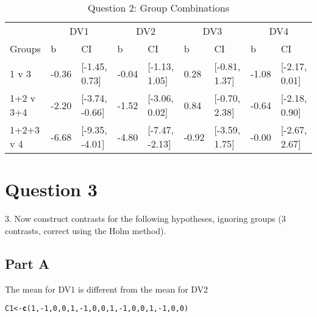 \documentclass{article}\usepackage[]{graphicx}\usepackage[]{color}
\makeatletter
\newcommand{\hlnum}[1]{\textcolor[rgb]{0.686,0.059,0.569}{#1}}%
\newcommand{\hlopt}[1]{\textcolor[rgb]{0,0,0}{#1}}%
\newcommand{\hlstd}[1]{\textcolor[rgb]{0.345,0.345,0.345}{#1}}%
\newcommand{\hlkwb}[1]{\textcolor[rgb]{0.69,0.353,0.396}{#1}}%
\newcommand{\hlkwd}[1]{\textcolor[rgb]{0.737,0.353,0.396}{\textbf{#1}}}%
\newenvironment{kframe}{%
 \def\at@end@of@kframe{}%
 \ifinner\ifhmode%
  \def\at@end@of@kframe{\end{minipage}}%
  \begin{minipage}{\columnwidth}%
 \fi\fi%
 \def\FrameCommand##1{\hskip\@totalleftmargin \hskip-\fboxsep
 \colorbox{shadecolor}{##1}\hskip-\fboxsep
     \hskip-\linewidth \hskip-\@totalleftmargin \hskip\columnwidth}%
 \MakeFramed {\advance\hsize-\width
   \@totalleftmargin\z@ \linewidth\hsize
   \@setminipage}}%
 {\par\unskip\endMakeFramed%
 \at@end@of@kframe}
\newenvironment{knitrout}{}{} %
\makeatother
\begin{document}
\begin{knitrout}
\begin{table}
\caption{\label{tab:unnamed-chunk-10}Question 2: Group Combinations}
\centering
\begin{tabular}[t]{lllllllll}
\toprule
\multicolumn{1}{c}{ } & \multicolumn{2}{c}{DV1} & \multicolumn{2}{c}{DV2} & \multicolumn{2}{c}{DV3} & \multicolumn{2}{c}{DV4} \\
\cmidrule(l{2pt}r{2pt}){2-3} \cmidrule(l{2pt}r{2pt}){4-5} \cmidrule(l{2pt}r{2pt}){6-7} \cmidrule(l{2pt}r{2pt}){8-9}
Groups & b & CI & b & CI & b & CI & b & CI\\
\midrule
1 v 3 & -0.36 & [-1.45, 0.73] & -0.04 & [-1.13, 1.05] & 0.28 & [-0.81, 1.37] & -1.08 & [-2.17, 0.01]\\
1+2 v 3+4 & -2.20 & [-3.74, -0.66] & -1.52 & [-3.06, 0.02] & 0.84 & [-0.70, 2.38] & -0.64 & [-2.18, 0.90]\\
1+2+3 v 4 & -6.68 & [-9.35, -4.01] & -4.80 & [-7.47, -2.13] & -0.92 & [-3.59, 1.75] & -0.00 & [-2.67, 2.67]\\
\bottomrule
\end{tabular}
\end{table}


\end{knitrout}


\section{Question 3}
3. Now construct contrasts for the following hypotheses, ignoring groups (3 contrasts, correct using the Holm method).

\subsection{Part A}
The mean for DV1 is different from the mean for DV2
\begin{knitrout}
\color{fgcolor}\begin{kframe}
\begin{alltt}
\hlstd{C1} \hlkwb{<-} \hlkwd{c}\hlstd{(}\hlnum{1}\hlstd{,}\hlopt{-}\hlnum{1}\hlstd{,}\hlnum{0}\hlstd{,}\hlnum{0}\hlstd{,} \hlnum{1}\hlstd{,}\hlopt{-}\hlnum{1}\hlstd{,}\hlnum{0}\hlstd{,}\hlnum{0}\hlstd{,} \hlnum{1}\hlstd{,}\hlopt{-}\hlnum{1}\hlstd{,}\hlnum{0}\hlstd{,}\hlnum{0}\hlstd{,} \hlnum{1}\hlstd{,}\hlopt{-}\hlnum{1}\hlstd{,}\hlnum{0}\hlstd{,}\hlnum{0}\hlstd{)}
\end{alltt}
\end{kframe}
\end{knitrout}
\end{document}
